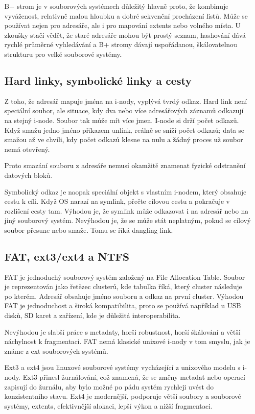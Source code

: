 B+ strom je v souborových systémech důležitý hlavně proto, že kombinuje vyváženost, relativně malou hloubku a dobré sekvenční procházení listů. Může se používat nejen pro adresáře, ale i pro mapování extents nebo volného místa. U zkoušky stačí vědět, že staré adresáře mohou být prostý seznam, hashování dává rychlé průměrné vyhledávání a B+ stromy dávají uspořádanou, škálovatelnou strukturu pro velké souborové systémy.

\subsection*{Hard linky, symbolické linky a cesty}

Z toho, že adresář mapuje jména na i-nody, vyplývá tvrdý odkaz. Hard link není speciální soubor, ale situace, kdy dva nebo více adresářových záznamů odkazují na stejný i-node. Soubor tak může mít více jmen. I-node si drží počet odkazů. Když smažu jedno jméno příkazem unlink, reálně se sníží počet odkazů; data se smažou až ve chvíli, kdy počet odkazů klesne na nulu a žádný proces už soubor nemá otevřený.

Proto smazání souboru z adresáře nemusí okamžitě znamenat fyzické odstranění datových bloků.

Symbolický odkaz je naopak speciální objekt s vlastním i-nodem, který obsahuje cestu k cíli. Když OS narazí na symlink, přečte cílovou cestu a pokračuje v rozlišení cesty tam. Výhodou je, že symlink může odkazovat i na adresář nebo na jiný souborový systém. Nevýhodou je, že se může stát neplatným, pokud se cílový soubor přesune nebo smaže. Tomu se říká dangling link.

\subsection*{FAT, ext3/ext4 a NTFS}

FAT je jednoduchý souborový systém založený na File Allocation Table. Soubor je reprezentován jako řetězec clusterů, kde tabulka říká, který cluster následuje po kterém. Adresář obsahuje jméno souboru a odkaz na první cluster. Výhodou FAT je jednoduchost a široká kompatibilita, proto se používá například u USB disků, SD karet a zařízení, kde je důležitá interoperabilita.

Nevýhodou je slabší práce s metadaty, horší robustnost, horší škálování a větší náchylnost k fragmentaci. FAT nemá klasické unixové i-nody v tom smyslu, jak je známe z ext souborových systémů.

Ext3 a ext4 jsou linuxové souborové systémy vycházející z unixového modelu s i-nody. Ext3 přinesl žurnálování, což znamená, že se změny metadat nebo operací zapisují do žurnálu, aby bylo možné po pádu systém rychleji uvést do konzistentního stavu. Ext4 je modernější, podporuje větší soubory a souborové systémy, extents, efektivnější alokaci, lepší výkon a nižší fragmentaci.

